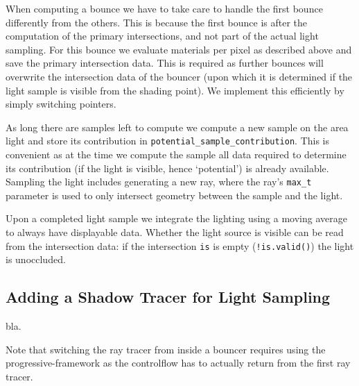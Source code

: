 \documentclass[a4paper,11pt]{scrartcl}
\begin{document}
When computing a bounce we have to take care to handle the first bounce differently from the others.
This is because the first bounce is after the computation of the primary intersections, and not part of the actual light sampling.
For this bounce we evaluate materials per pixel as described above and save the primary intersection data.
This is required as further bounces will overwrite the intersection data of the bouncer
	(upon which it is determined if the light sample is visible from the shading point).
We implement this efficiently by simply switching pointers.

As long there are samples left to compute we compute a new sample on the area light and store its contribution in 
	\lstinline|potential_sample_contribution|.
This is convenient as at the time we compute the sample all data required to determine its contribution (if the light is visible, hence `potential')
	is already available.
Sampling the light includes generating a new ray, 
	where the ray's \lstinline|max_t| parameter is used to only intersect geometry between the sample and the light.

Upon a completed light sample we integrate the lighting using a moving average to always have displayable data.
Whether the light source is visible can be read from the intersection data: if the intersection \lstinline|is| is empty (\lstinline|!is.valid()|)
	the light is unoccluded.

\subsection{Adding a Shadow Tracer for Light Sampling}
bla.

Note that switching the ray tracer from inside a bouncer requires using the progressive-framework 
	as the controlflow has to actually return from the first ray tracer.
\end{document}
